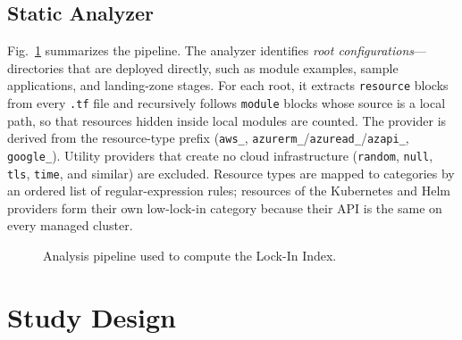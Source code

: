 \documentclass[conference]{IEEEtran}
\begin{document}
\subsection{Static Analyzer}
Fig.~\ref{fig:pipeline} summarizes the pipeline. The analyzer identifies \emph{root configurations}---directories that are deployed directly, such as module examples, sample applications, and landing-zone stages. For each root, it extracts \texttt{resource} blocks from every \texttt{.tf} file and recursively follows \texttt{module} blocks whose source is a local path, so that resources hidden inside local modules are counted. The provider is derived from the resource-type prefix (\texttt{aws\_}, \texttt{azurerm\_}/\texttt{azuread\_}/\texttt{azapi\_}, \texttt{google\_}). Utility providers that create no cloud infrastructure (\texttt{random}, \texttt{null}, \texttt{tls}, \texttt{time}, and similar) are excluded. Resource types are mapped to categories by an ordered list of regular-expression rules; resources of the Kubernetes and Helm providers form their own low-lock-in category because their API is the same on every managed cluster.

\begin{figure}[t]
\centering
{}
\caption{Analysis pipeline used to compute the Lock-In Index.}
\label{fig:pipeline}
\end{figure}

\section{Study Design}
\label{sec:design}
\end{document}
